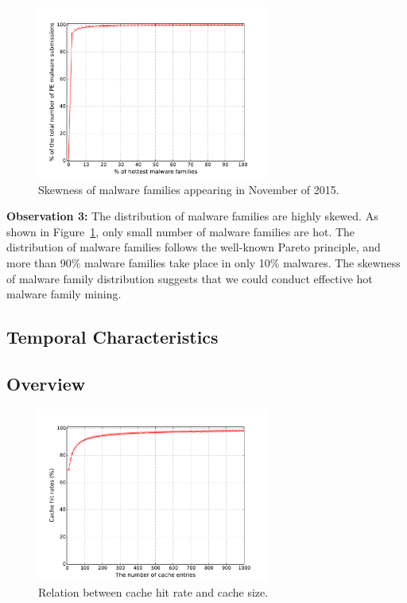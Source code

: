 \begin{figure}[t!]
\begin{center}
\includegraphics[width=3.0in]{figure/cum}
\caption{Skewness of malware families appearing in November of 2015.}
\label{fig:acum}
\end{center}
\end{figure}

{\bf Observation 3:} 
The distribution of malware families are highly skewed. 
As shown in Figure~\ref{fig:acum}, only small number of malware families are hot.
The distribution of malware families follows the well-known Pareto principle, 
and more than 90\% malware families take place in only 10\% malwares. 
The skewness of malware family distribution suggests that we could conduct effective hot malware family mining. 


\subsection{Temporal Characteristics}
\label{sec:predict}

\subsection{Overview}

\begin{figure}[t!]
\begin{center}
\includegraphics[width=3.0in]{figure/LRU}
\caption{Relation between cache hit rate and cache size.}
\label{fig:cache}
\end{center}
\end{figure}


